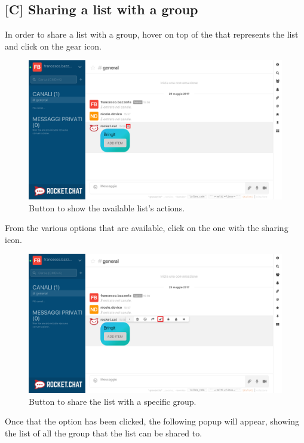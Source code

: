 \newpage
\subsection{[C] Sharing a list with a group}
In order to share a list with a group, hover on top of the  that represents the list and click on the gear icon.

\begin{figure}[H]
  \centering 
  \includegraphics[width=\textwidth]{Sections/3-HowToUse/Images/bubble_options_button.png}
  \caption{Button to show the available list's actions.}
\end{figure}

From the various options that are available, click on the one with the sharing icon.

\begin{figure}[H]
  \centering 
  \includegraphics[width=\textwidth]{Sections/3-HowToUse/Images/bubble_option_share_group.png}
  \caption{Button to share the list with a specific group.}
\end{figure}

Once that the option has been clicked, the following popup will appear, showing the list of all the group that the list can be shared to.

